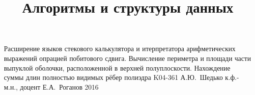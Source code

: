 \documentclass[a4paper,12pt]{memoir}
\def\+{\hskip 0.15mm}
\begin{document}
\renewcommand{\contentsname}{{\Large{Содержание}\hfill}}

\title{Алгоритмы и структуры данных}
{Расширение языков стекового калькулятора и итерпретатора арифметических
выражений опрацией побитового сдвига.
Вычисление периметра и площади части выпуклой оболочки, расположенной в
верхней полуплоскости. Нахождение суммы длин полностью видимых рёбер полиэдра}
{K04-361}
{А.\+Ю.~Шедько}
{к.ф.-м.н., доцент}
{Е.\+А.~Роганов}
{2016}








\newpage
%
%
\end{document}
